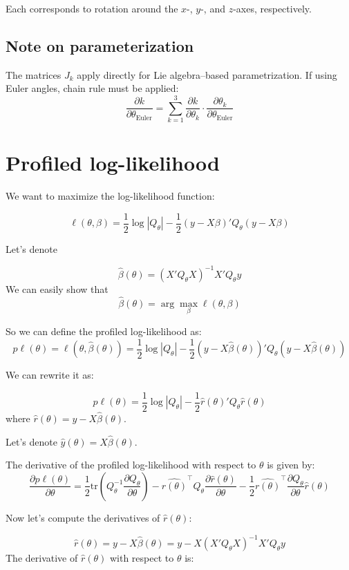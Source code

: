 \documentclass{article}
\begin{document}
Each corresponds to rotation around the \( x \)-, \( y \)-, and \( z \)-axes, respectively.

\subsection*{Note on parameterization}

The matrices \( J_k \) apply directly for Lie algebra–based parametrization. If using Euler angles, chain rule must be applied:
\[
\frac{\partial k}{\partial \theta_{\text{Euler}}} = \sum_{k=1}^3 \frac{\partial k}{\partial \theta_k} \cdot \frac{\partial \theta_k}{\partial \theta_{\text{Euler}}}
\]


\section{Profiled log-likelihood}

We want to maximize the log-likelihood function:

\[\ell(\theta,\beta) = \frac{1}{2} \log |Q_\theta| -\frac{1}{2}(y-X\beta)'Q_\theta(y-X\beta) \]

Let's denote

\[\hat\beta(\theta) = {(X'Q_\theta X)}^{-1}X'Q_\theta y\]
We can easily show that  \[\hat\beta(\theta) = \arg\max_\beta \ell(\theta,\beta)\]

So we can define the profiled log-likelihood as:
\[p\ell(\theta) = \ell(\theta,\hat\beta(\theta)) = \frac{1}{2} \log |Q_\theta| -\frac{1}{2}(y-X\hat\beta(\theta))'Q_\theta(y-X\hat\beta(\theta)) \]

We can rewrite it as:

\[p\ell(\theta) = \frac{1}{2} \log |Q_\theta| -\frac{1}{2}\hat r(\theta)'Q_\theta\hat r(\theta)
\]
where \(\hat r(\theta) = y-X\hat\beta(\theta)\).

Let's denote \( \hat y(\theta) = X\hat\beta(\theta) \).

The derivative of the profiled log-likelihood with respect to \(\theta\) is given by:
\[\frac{\partial p\ell(\theta)}{\partial \theta} = \frac{1}{2} \mathrm{tr}\left(Q_\theta^{-1} \frac{\partial Q_\theta}{\partial \theta}\right)
 -  \hat {r(\theta)}^\top Q_\theta \frac{\partial \hat r(\theta)}{\partial \theta}
 -  \frac{1}{2}\hat {r(\theta)}^\top  \frac{\partial Q_\theta}{\partial \theta} \hat r(\theta) \]

 Now let's compute the derivatives of \(\hat r(\theta)\):

\[\hat r(\theta) = y - X\hat\beta(\theta) = y - X{(X'Q_\theta X)}^{-1}X'Q_\theta y\]
The derivative of \(\hat r(\theta)\) with respect to \(\theta\) is:
\end{document}
